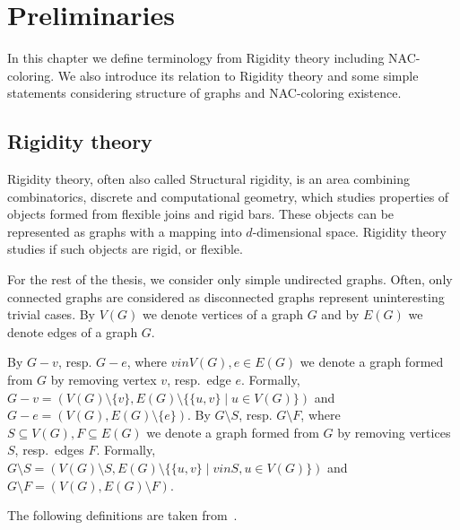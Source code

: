 
\chapter{Preliminaries}

\begin{chapterabstract}

	In this chapter we define terminology from Rigidity theory including NAC-coloring.
	We also introduce its relation to Rigidity theory and
	some simple statements considering
	structure of graphs and NAC-coloring existence.

\end{chapterabstract}

\section{Rigidity theory}

Rigidity theory, often also called Structural rigidity,
is an area combining combinatorics, discrete and computational geometry,
which studies properties of objects formed from flexible joins and rigid bars.
These objects can be represented as graphs with
a mapping into \( d \)-dimensional space.
Rigidity theory studies if such objects are rigid, or flexible.

For the rest of the thesis,
we consider only simple undirected graphs.
Often, only connected graphs are considered as disconnected graphs
represent uninteresting trivial cases.
By \( V(G) \) we denote vertices of a graph \( G \) and
by \( E(G) \) we denote edges of a graph \( G \).

By \( G - v \), resp. \( G - e \),
where \( v in V(G), e \in E(G) \) we denote a graph
formed from \( G \) by removing vertex \( v \), resp.\ edge \( e \).
Formally,
\( G - v = (V(G) \setminus \{v\}, E(G) \setminus \{\{u, v\} \mid u \in V(G)\}) \)
and \( G - e = (V(G), E(G) \setminus \{e\}) \).
By \( G \setminus S \), resp. \( G \setminus F \),
where \( S \subseteq V(G), F \subseteq E(G) \) we denote a graph
formed from \( G \) by removing vertices \( S \), resp.\ edges \( F \).
Formally,
\( G \setminus S = (V(G) \setminus S, E(G) \setminus \{\{u, v\} \mid v in S, u \in V(G)\}) \)
and \( G \setminus F = (V(G), E(G) \setminus F) \).

The following definitions are taken from~\cite{np_complete,my_paper}.

